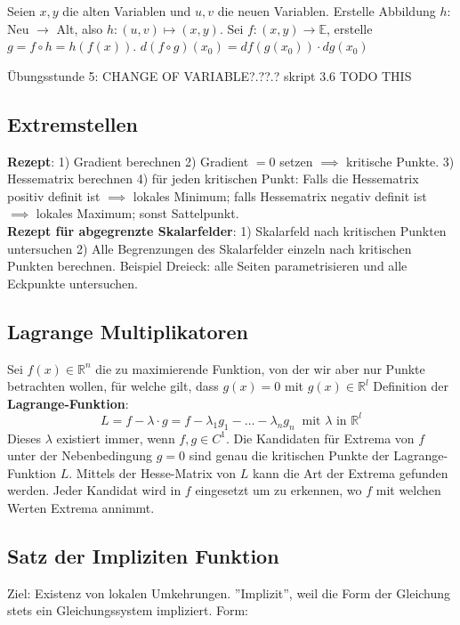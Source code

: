 Seien $x, y$ die alten Variablen und $u, v$ die neuen Variablen. Erstelle Abbildung $h:$ Neu $\to$ Alt, also $h: (u, v) \mapsto (x, y)$. Sei $f: (x, y) \to \mathbb{E}$, erstelle $g = f \circ h = h(f(x))$. $d (f \circ g) (x_0) = df(g(x_0)) \cdot dg(x_0)$

Übungsstunde 5: CHANGE OF VARIABLE?.??.? skript 3.6 TODO THIS

\subsection{Extremstellen}

\textbf{Rezept}: 1) Gradient berechnen 2) Gradient $=0$ setzen $\implies$ kritische Punkte. 3) Hessematrix berechnen 4) für jeden kritischen Punkt: Falls die Hessematrix positiv definit ist $\implies$ lokales Minimum; falls Hessematrix negativ definit ist $\implies$ lokales Maximum; sonst Sattelpunkt.\\

\textbf{Rezept für abgegrenzte Skalarfelder}: 1) Skalarfeld nach kritischen Punkten untersuchen 2) Alle Begrenzungen des Skalarfelder einzeln nach kritischen Punkten berechnen. Beispiel Dreieck: alle Seiten parametrisieren und alle Eckpunkte untersuchen.

\subsection{Lagrange Multiplikatoren}
Sei $f(x) \in \mathbb{R}^{n}$ die zu maximierende Funktion, von der wir aber nur Punkte
betrachten wollen, für welche gilt, dass $g(x) = 0$ mit $g(x) \in \mathbb{R}^{l}$
Definition der \textbf{Lagrange-Funktion}:
\[ L = f-\lambda \cdot g = f - \lambda_{1} g_{1} - \ldots - \lambda_{n}g_{n} ~ \text{ mit $\lambda$ in } \mathbb{R}^{l} \]
Dieses $\lambda$ existiert immer, wenn $f, g \in C^{1}$.
Die Kandidaten für Extrema von $f$ unter der Nebenbedingung $g = 0$ sind genau die
kritischen Punkte der Lagrange-Funktion $L$. Mittels der Hesse-Matrix von $L$
kann die Art der Extrema gefunden werden. Jeder Kandidat wird in $f$ eingesetzt
um zu erkennen, wo $f$ mit welchen Werten Extrema annimmt.

\subsection{Satz der Impliziten Funktion}

Ziel: Existenz von lokalen Umkehrungen. ''Implizit'', weil die Form der Gleichung stets ein Gleichungssystem impliziert. Form:

